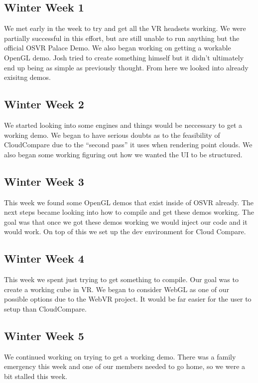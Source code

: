\documentclass{article}
\begin{document}
\subsection{Winter Week 1}

We met early in the week to try and get all the VR headsets working. 
We were partially successful in this effort, but are still unable to run anything but the official OSVR Palace Demo.
We also began working on getting a workable OpenGL demo.
Josh tried to create something himself but it didn't ultimately end up being as simple as previously thought.
From here we looked into already exisitng demos.

\subsection{Winter Week 2}

We started looking into some engines and things would be neccessary to get a working demo.
We began to have serious doubts as to the feasibility of CloudCompare due to the “second pass” it uses when rendering point clouds.
We also began some working figuring out how we wanted the UI to be structured.

\subsection{Winter Week 3}

This week we found some OpenGL demos that exist inside of OSVR already.
The next steps became looking into how to compile and get these demos working.
The goal was that once we got these demos working we would inject our code and it would work.
On top of this we set up the dev environment for Cloud Compare.

\subsection{Winter Week 4}

This week we spent just trying to get something to compile.
Our goal was to create a working cube in VR.
We began to consider WebGL as one of our possible options due to the WebVR project. 
It would be far easier for the user to setup than CloudCompare.

\subsection{Winter Week 5}

We continued working on trying to get a working demo.
There was a family emergency this week and one of our members needed to go home, so we were a bit stalled this week.
\end{document}
